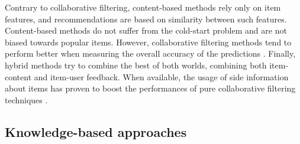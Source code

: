 Contrary to collaborative filtering, content-based methods \citep{Mooney1999} rely only on item features, and recommendations are based on similarity between such features. Content-based methods do not suffer from the cold-start problem and are not biased towards popular items. However, collaborative filtering methods tend to perform better when measuring the overall accuracy of the predictions \citep{pilaszy2009recommending}.
Finally, hybrid methods \citep{Burke2002} try to combine the best of both worlds, combining both item-content and item-user feedback. 
When available, the usage of side information about items has proven to boost the performances of pure collaborative filtering techniques \citep{Ning2012}. %



\subsection{Knowledge-based approaches}
\label{sec:SOA:mir:recommendation:semantic}

